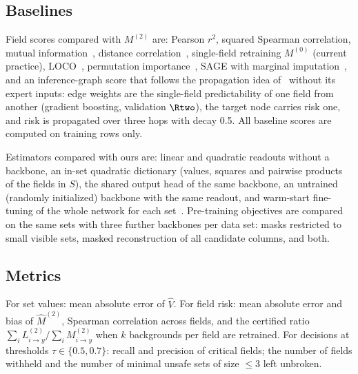 \subsection{Baselines}
Field scores compared with $M^{(2)}$ are: Pearson $r^2$, squared Spearman correlation, mutual
information~\cite{kraskov2004mi}, distance correlation~\cite{szekely2007dcor}, single-field
retraining $M^{(0)}$ (current practice), LOCO~\cite{lei2018loco}, permutation
importance~\cite{breiman2001rf}, SAGE with marginal imputation~\cite{covert2020sage}, and an
inference-graph score that follows the propagation idea of~\cite{hu2026ignn} without its expert
inputs: edge weights are the single-field predictability of one field from another (gradient
boosting, validation $\Rtwo$), the target node carries risk one, and risk is propagated over three
hops with decay 0.5. All baseline scores are computed on training rows only.

Estimators compared with ours are: linear and quadratic readouts without a backbone, an in-set
quadratic dictionary (values, squares and pairwise products of the fields in $S$), the shared
output head of the same backbone, an untrained (randomly initialized) backbone with the same
readout, and warm-start fine-tuning of the whole network for each set~\cite{sun2025warmstart}. Pre-training
objectives are compared on the same sets with three further backbones per data set: masks restricted to small visible
sets, masked reconstruction of all candidate columns, and both.

\subsection{Metrics}
For set values: mean absolute error of $\hat V$. For field risk: mean absolute error and bias of
$\hat M^{(2)}$, Spearman correlation across fields, and the certified ratio
$\sum_i L^{(2)}_{i\to y}/\sum_i M^{(2)}_{i\to y}$ when $k$ backgrounds per field are retrained.
For decisions at thresholds $\tau\in\{0.5,0.7\}$: recall and precision of critical fields; the
number of fields withheld and the number of minimal unsafe sets of size $\le 3$ left unbroken.
